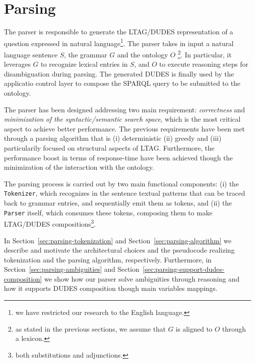 \section{Parsing}
\label{sec:parsing}

The parser is responsible to generate the LTAG/DUDES representation of a question expressed in natural language\footnote{we have restricted our research to the English language.}. 
%
The parser takes in input a natural language sentence $S$, the grammar $G$ and the ontology $O$ \footnote{as stated in the previous sections, we assume that $G$ is aligned to $O$ through a lexicon.}.
%
In particular, it leverages $G$ to recognize lexical entries in $S$, and $O$ to execute reasoning steps for disambiguation during parsing.
%
The generated DUDES is finally used by the applicatio control layer to compose the SPARQL query to be submitted to the ontology.


The parser has been designed addressing two main requirement: \textit{correctness} and \textit{minimization of the syntactic/semantic search space}, which is the most critical aspect to achieve better performance.
%
The previous requirements have been met through a parsing algorithm that is (i) deterministic (ii) greedy and (iii) particularily focused on structural aspects of LTAG.
Furthermore, the performance boost in terms of response-time have been achieved though the minimization of the interaction with the ontology.

The parsing process is carried out by two main functional components: 
(i) the \texttt{Tokenizer}, which recognizes in the sentence textual patterns that can be traced back to grammar entries, and sequentially emit them as tokens, and 
(ii) the \texttt{Parser} itself, which consumes these tokens, composing them to make LTAG/DUDES compositions\footnote{both substitutions and adjunctions.}.

In Section~\ref{sec:parsing-tokenization} and Section~\ref{sec:parsing-algorithm} we describe and motivate the architectural choices and the pseudocode realizing tokenization and the parsing algorithm, respectively.
%
Furthermore, in Section~\ref{sec:parsing-ambiguities} and Section~\ref{sec:parsing-support-dudes-composition} we show how our parser solve ambiguities through reasoning and how it supports DUDES composition though main variables mappings.




